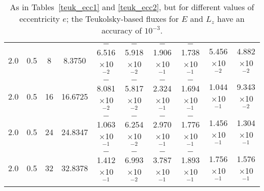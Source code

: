 \documentclass[aps,prd,twocolumn,showpacs,groupedaddress,nofootinbib]{revtex4}
\begin{document}
\begin{widetext}
\begin{table}[h]
\begin{tabular}{|c|c|c|c|c|c|c|c|c|c|}
  2.0&  0.5&  8&  8.3750& $-$6.516$\times$10$^{-2}$& $-$5.918$\times$10$^{-2}$& $-$1.906$\times$10$^{-1}$& $-$1.738$\times$10$^{-1}$&  5.456$\times$10$^{-2}$&    4.882$\times$10$^{-2}$\\
  2.0&  0.5& 16& 16.6725& $-$8.081$\times$10$^{-2}$& $-$5.817$\times$10$^{-2}$& $-$2.324$\times$10$^{-1}$& $-$1.694$\times$10$^{-1}$&  1.044$\times$10$^{-1}$&    9.343$\times$10$^{-2}$\\
  2.0&  0.5& 24& 24.8347& $-$1.063$\times$10$^{-1}$& $-$6.254$\times$10$^{-2}$& $-$2.970$\times$10$^{-1}$& $-$1.776$\times$10$^{-1}$&  1.456$\times$10$^{-1}$&    1.304$\times$10$^{-1}$\\
  2.0&  0.5& 32& 32.8378& $-$1.412$\times$10$^{-1}$& $-$6.993$\times$10$^{-2}$& $-$3.787$\times$10$^{-1}$& $-$1.893$\times$10$^{-1}$&  1.756$\times$10$^{-1}$&    1.576$\times$10$^{-1}$\\
  \hline
 \end{tabular}
 \caption{As in Tables~\ref{teuk_ecc1} and \ref{teuk_ecc2}, but for
   different values of eccentricity $e$; the Teukolsky-based fluxes for $E$ and $L_z$ have an accuracy of $10^{-3}$.\label{teuk_ecc3}}
\end{table}


\end{widetext}
\end{document}
